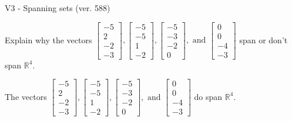\begin{exercise}
  \begin{exerciseTitle}V3 - Spanning sets (ver. 588)\end{exerciseTitle}
  \begin{exerciseStatement}
    Explain why the vectors \(\left[\begin{array}{r}
-5 \\
2 \\
-2 \\
-3
\end{array}\right] , \left[\begin{array}{r}
-5 \\
-5 \\
1 \\
-2
\end{array}\right] , \left[\begin{array}{r}
-5 \\
-3 \\
-2 \\
0
\end{array}\right] , \text{ and } \left[\begin{array}{r}
0 \\
0 \\
-4 \\
-3
\end{array}\right]\) span or don't span \(\mathbb{R}^4\). 
	


  \end{exerciseStatement}
  \begin{exerciseAnswer}
   The vectors \(\left[\begin{array}{r}
-5 \\
2 \\
-2 \\
-3
\end{array}\right] , \left[\begin{array}{r}
-5 \\
-5 \\
1 \\
-2
\end{array}\right] , \left[\begin{array}{r}
-5 \\
-3 \\
-2 \\
0
\end{array}\right] , \text{ and } \left[\begin{array}{r}
0 \\
0 \\
-4 \\
-3
\end{array}\right]\) 
  	 do  
	span \(\mathbb{R}^4\).
  


  \end{exerciseAnswer}
\end{exercise}
